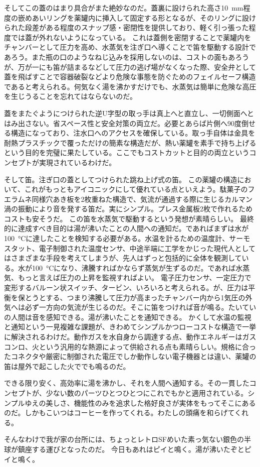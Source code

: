\documentclass{sokuten}
\begin{document}
そしてこの蓋のはまり具合がまた絶妙なのだ。蓋裏に設けられた高さ\SI{10}{\milli\m}程度の嵌めあいリングを薬罐内に挿入して固定する形となるが、そのリングに設けられた段差がある程度のスナップ感・密閉性を提供しており、軽く引っ張った程度では蓋が外れないようになっている。
これは蓋側を密閉することで薬罐内をチャンバーとして圧力を高め、水蒸気を注ぎ口へ導くことで笛を駆動する設計であろう。また瓶の口のようなねじ込みを採用しないのは、コストの面もあろうが、万が一にも笛が詰まるなどして圧力の逃げ場がなくなった際、安全弁として蓋を飛ばすことで容器破裂などより危険な事態を防ぐためのフェイルセーフ構造であると考えられる。何気なく湯を沸かすだけでも、水蒸気は簡単に危険な高圧を生じうることを忘れてはならないのだ。

蓋をまたぐようにつけられた逆U字型の取っ手は真上へと直立し、一切側面へとはみ出さない。省スペース性と安全対策の両立だ。必要とあらば片側へ90度倒せる構造になっており、注水口へのアクセスを確保している。取っ手自体は金具を耐熱プラスチックで覆っただけの簡素な構造だが、熱い薬罐を素手で持ち上げるという目的を完璧に果たしている。ここでもコストカットと目的の両立というコンセプトが実現されているわけだ。

そして笛。注ぎ口の蓋としてつけられた跳ね上げ式の笛。
この薬罐の構造において、これがもっともアイコニックにして優れている点といえよう。駄菓子のフエラムネ同様穴あき板を2枚重ねた構造で、気流が通過する際に生じるカルマン渦の振動により音を発する笛だ。実にシンプル。プレス金属板2枚で作れるためコストも安そうだ。
この笛を水蒸気で駆動するという発想が素晴らしい。
最終的に達成すべき目的は湯が沸いたことの人間への通知だ。であればまずは水が\SI{100}{\degreeCelsius}に達したことを検知する必要がある。水温を計るための温度計、サーモスタット、電子制御された温度センサ、中途半端に工学をかじった現代人としてはさまざまな手段を考えてしまうが、先人はずっと包括的に全体を観測している。水が\SI{100}{\degreeCelsius}になり、沸騰すればかならず蒸気が生ずるのだ。であれば水蒸気、もっと言えば圧力の上昇を監視すればよい。
電子圧力センサ、一定圧力で変形するバルーン状スイッチ、タービン、いろいろと考えられる。が、圧力は平衡を保とうとする、つまり沸騰して圧力が高まったチャンバー内から1気圧の外気へは必ず一方向の気流が生じるのだ。そこに笛をつければ音が鳴る。たいていの人間は音を感知できる。湯が沸いたことを通知できる。
かくして水温の監視と通知という一見複雑な課題が、きわめてシンプルかつローコストな構造で一挙に解決されるわけだ。動作ガスを水自身から調達する点、動作エネルギーはガスコンロ、火という汎用的な熱源によって供給される点も素晴らしい。規格に合ったコネクタや厳密に制御された電圧でしか動作しない電子機器とは違い、薬罐の笛は屋外で起こした火ででも鳴るのだ。

できる限り安く、高効率に湯を沸かし、それを人間へ通知する。その一貫したコンセプトが、少ない数のパーツひとつひとつにこれでもかと適用されている。シンプルゆえの美しさ、機能性のみを追求した格好良さが実体をもってそこにあるのだ。しかもこいつはコーヒーを作ってくれる。わたしの頭痛を和らげてくれる。

そんなわけで我が家の台所には、ちょっとレトロSFめいた素っ気ない銀色の半球が鎮座する運びとなったのだ。
今日もあれはピイと鳴く。湯が沸いたぞとピイと鳴く。
\end{document}
